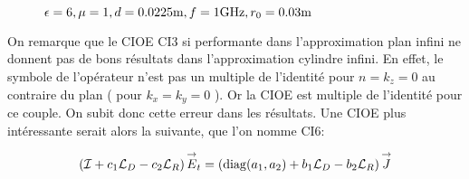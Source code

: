 \begin{figure}[!hbt]
          \caption[CIOE sur empilement de Hoppe & Rahmat-Samii p.~62]{\(\epsilon = 6, \mu = 1, d=0.0225\text{m}, f=1\text{GHz}, r_0=0.03\text{m}\)}
          \label{fig:imp_fourier:plan:hoppe:62:hoibc}
      \end{figure}


    On remarque que le CIOE CI3 si performante dans l'approximation plan infini ne donnent pas de bons résultats dans l’approximation cylindre infini. En effet, le symbole de l'opérateur n'est pas un multiple de l'identité pour \(n=k_z=0\) au contraire du plan ( pour \(k_x=k_y=0\) ). Or la CIOE est multiple de l'identité pour ce couple. On subit donc cette erreur dans les résultats. Une CIOE plus intéressante serait alors la suivante, que l'on nomme CI6:

    \begin{equation}
      \left({\mathcal{I}} + c_1{\mathcal{L}_D} -c_2{\mathcal{L}_R}\right){\overset{\rightarrow}{E}}_t = \left(\operatorname{diag}(a_1,a_2) + b_1{\mathcal{L}_D} - b_2 {\mathcal{L}_R} \right){\overset{\rightarrow}{J}}
    \end{equation}

